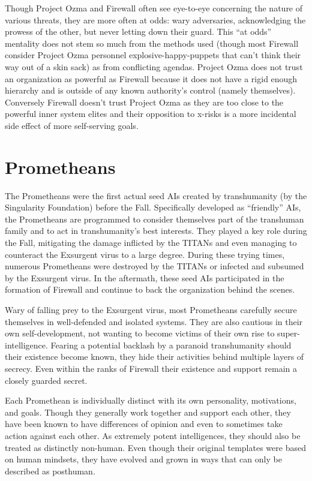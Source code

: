 Though Project Ozma and Firewall often see eye-to-eye
concerning the nature of various threats, they are
more often at odds: wary adversaries, acknowledging 
the prowess of the other, but never letting down their 
guard. This ``at odds'' mentality does not stem so much 
from the methods used (though most Firewall consider 
Project Ozma personnel explosive-happy-puppets that 
can't think their way out of a skin sack) as from 
conflicting agendas. Project Ozma does not trust an 
organization as powerful as Firewall because it does 
not have a rigid enough hierarchy and is outside of any 
known authority's control (namely themselves). Conversely
Firewall doesn't trust Project Ozma as they are
too close to the powerful inner system elites and their 
opposition to x-risks is a more incidental side effect of 
more self-serving goals.

\section{Prometheans }

The Prometheans were the first actual seed AIs created
by transhumanity (by the Singularity Foundation)
before the Fall. Specifically developed as ``friendly'' 
AIs, the Prometheans are programmed to consider 
themselves part of the transhuman family and to act 
in transhumanity's best interests. They played a key 
role during the Fall, mitigating the damage inflicted 
by the TITANs and even managing to counteract the 
Exsurgent virus to a large degree. During these trying 
times, numerous Prometheans were destroyed by the 
TITANs or infected and subsumed by the Exsurgent 
virus. In the aftermath, these seed AIs participated in 
the formation of Firewall and continue to back the 
organization behind the scenes.

Wary of falling prey to the Exsurgent virus, most 
Prometheans carefully secure themselves in well-defended
and isolated systems. They are also cautious
in their own self-development, not wanting to become 
victims of their own rise to super-intelligence. Fearing
a potential backlash by a paranoid transhumanity
should their existence become known, they hide
their activities behind multiple layers of secrecy. Even 
within the ranks of Firewall their existence and support
remain a closely guarded secret.

Each Promethean is individually distinct with its 
own personality, motivations, and goals. Though they 
generally work together and support each other, they 
have been known to have differences of opinion and 
even to sometimes take action against each other. As 
extremely potent intelligences, they should also be 
treated as distinctly non-human. Even though their 
original templates were based on human mindsets, 
they have evolved and grown in ways that can only 
be described as posthuman. 

